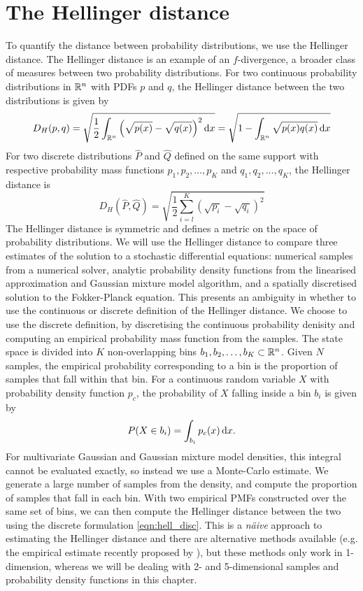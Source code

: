 \section{The Hellinger distance}
To quantify the distance between probability distributions, we use the Hellinger distance.
The Hellinger distance is an example of an \(f\)-divergence, a broader class of measures between two probability distributions.
For two continuous probability distributions in \(\mathbb{R}^n\) with PDFs \(p\) and \(q\), the Hellinger distance between the two distributions is given by
\[
	D_H\!\left(p, q\right) = \sqrt{\frac12 \int_{\R^n}{\left(\sqrt{p(x)} - \sqrt{q(x)}\right)^2\dif x}} = \sqrt{1 - \int_{\R^n}{\sqrt{p(x)q(x)}\dif x}}
\]
For two discrete distributions \(\hat{P}\) and \(\hat{Q}\) defined on the same support with respective probability mass functions \(p_1, p_2, \dotsc, p_K\) and \(q_1, q_2, \dotsc, q_K\), the Hellinger distance is
\begin{equation}\label{eqn:hell_disc}
	D_H\!\left(\hat{P}, \hat{Q}\right) = \sqrt{\frac12 \sum_{i=l}^{K}\left(\sqrt{p_i} - \sqrt{q_i}\right)^2}
\end{equation}
The Hellinger distance is symmetric and defines a metric on the space of probability distributions.
We will use the Hellinger distance to compare three estimates of the solution to a stochastic differential equations: numerical samples from a numerical solver, analytic probability density functions from the linearised approximation and Gaussian mixture model algorithm, and a spatially discretised solution to the Fokker-Planck equation.
This presents an ambiguity in whether to use the continuous or discrete definition of the Hellinger distance.
We choose to use the discrete definition, by discretising the continuous probability denisity and computing an empirical probability mass function from the samples.
The state space is divided into \(K\) non-overlapping bins \(b_1, b_2, \dotsc, b_K \subset \mathbb{R}^n\).
Given \(N\) samples, the empirical probability corresponding to a bin is the proportion of samples that fall within that bin.
For a continuous random variable \(X\) with probability density function \(p_c\), the probability of \(X\) falling inside a bin \(b_i\) is given by
\[
	P\!\left(X \in b_i\right) = \int_{b_i}{p_c(x)\dif x}.
\]
For multivariate Gaussian and Gaussian mixture model densities, this integral cannot be evaluated exactly, so instead we use a Monte-Carlo estimate.
We generate a large number of samples from the density, and compute the proportion of samples that fall in each bin.
With two empirical PMFs constructed over the same set of bins, we can then compute the Hellinger distance between the two using the discrete formulation \cref{eqn:hell_disc}.
This is a \emph{n\"aive} approach to estimating the Hellinger distance and there are alternative methods available (e.g. the empirical estimate recently proposed by \citet{DingMullhaupt_2023_EmpiricalSquaredHellinger}), but these methods only work in 1-dimension, whereas we will be dealing with 2- and 5-dimensional samples and probability density functions in this chapter.


